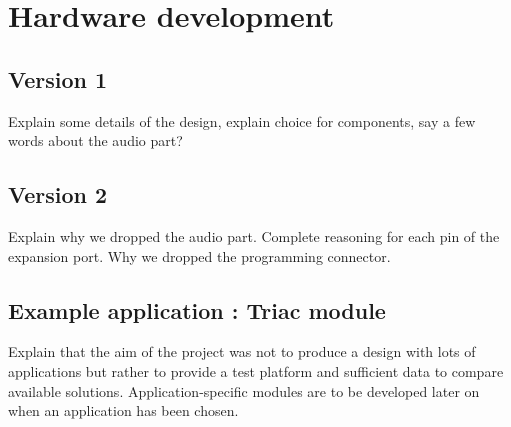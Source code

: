 \chapter{Hardware development}\label{ch:examples}
\section{Version 1}

Explain some details of the design, explain choice for components, say a few
words about the audio part?

\section{Version 2}

Explain why we dropped the audio part. Complete reasoning for each pin of the
expansion port. Why we dropped the programming connector.

\section{Example application : Triac module}

Explain that the aim of the project was not to produce a design with lots of
applications but rather to provide a test platform and sufficient data to
compare available solutions. Application-specific modules are to be developed
later on when an application has been chosen.
